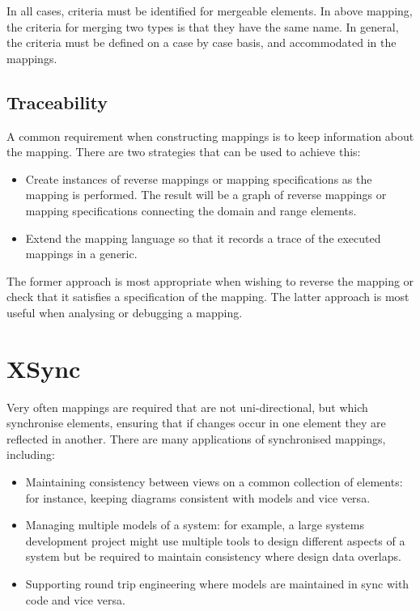 In all cases, criteria must be identified for mergeable elements.
In above mapping, the criteria for merging two types is that they
have the same name. In general, the criteria must be defined on a
case by case basis, and accommodated in the mappings.

\subsection{Traceability}

A common requirement when constructing mappings is to keep
information about the mapping. There are two strategies that can
be used to achieve this:

\begin{itemize}
\item Create instances of reverse mappings or mapping
specifications as the mapping is performed. The result will be a
graph of reverse mappings or mapping specifications connecting the
domain and range elements. \item Extend the mapping language so
that it records a trace of the executed mappings in a generic.
\end{itemize}

The former approach is most appropriate when wishing to reverse
the mapping or check that it satisfies a specification of the
mapping. The latter approach is most useful when analysing or
debugging a mapping.

\section{XSync}

Very often mappings are required that are not uni-directional, but
which synchronise elements, ensuring that if changes occur in one
element they are reflected in another. There are many applications
of synchronised mappings, including:

\begin{itemize}
\item Maintaining consistency between views on a common collection
of elements: for instance, keeping diagrams consistent with models
and vice versa. \item Managing multiple models of a system: for
example, a large systems development project might use multiple
tools to design different aspects of a system but be required to
maintain consistency where design data overlaps. \item Supporting
round trip engineering where models are maintained in sync with
code and vice versa.
\end{itemize}


